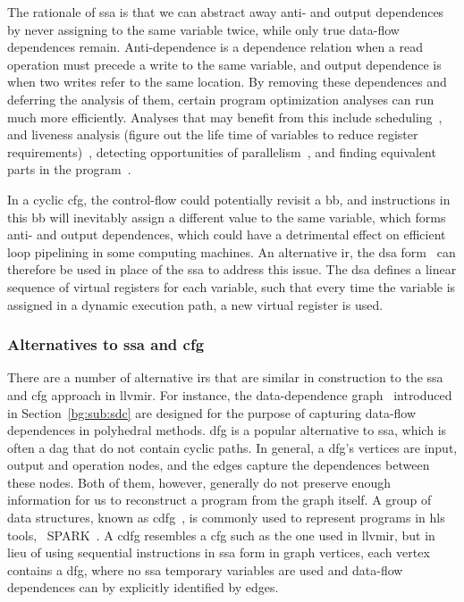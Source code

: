 The rationale of \gls{ssa} is that we can abstract away anti- and output
dependences by never assigning to the same variable twice, while only true
data-flow dependences remain.  Anti-dependence is a dependence relation when a
read operation must precede a write to the same variable, and output dependence
is when two writes refer to the same location.  By removing these dependences
and deferring the analysis of them, certain program optimization analyses
can run much more efficiently.  Analyses that may benefit from this include
scheduling~\cite{rau94}, and liveness analysis (figure out the life time
of variables to reduce register requirements)~\cite{cytron91}, detecting
opportunities of parallelism~\cite{cytron87}, and finding equivalent parts in
the program~\cite{alpern88}.

In a cyclic \gls{cfg}, the control-flow could potentially revisit a \gls{bb},
and instructions in this \gls{bb} will inevitably assign a different value to
the same variable, which forms anti- and output dependences, which could have
a detrimental effect on efficient loop pipelining in some computing machines.
An alternative \gls{ir}, the \gls{dsa} form~\cite{rau92} can therefore be used
in place of the \gls{ssa} to address this issue.  The \gls{dsa} defines a
linear sequence of virtual registers for each variable, such that every time
the variable is assigned in a dynamic execution path, a new virtual register is
used.

\subsubsection{Alternatives to \gls{ssa} and \gls{cfg}}

There are a number of alternative \glspl{ir} that are similar in construction
to the \gls{ssa} and \gls{cfg} approach in \gls{llvmir}\@.  For instance, the
data-dependence graph~\cite{rau94} introduced in Section~\ref{bg:sub:sdc} are
designed for the purpose of capturing data-flow dependences in polyhedral
methods. \gls{dfg} is a popular alternative to \gls{ssa}, which is often a
\gls{dag} that do not contain cyclic paths.  In general, a \gls{dfg}'s vertices
are input, output and operation nodes, and the edges capture the dependences
between these nodes.  Both of them, however, generally do not preserve enough
information for us to reconstruct a program from the graph itself.  A group of
data structures, known as \gls{cdfg}~\cite{orailoglu86}, is commonly used to
represent programs in \gls{hls} tools, \eg~SPARK~\cite{gupta04}.  A \gls{cdfg}
resembles a \gls{cfg} such as the one used in \gls{llvmir}, but in lieu of
using sequential instructions in \gls{ssa} form in graph vertices, each vertex
contains a \gls{dfg}, where no \gls{ssa} temporary variables are used and
data-flow dependences can by explicitly identified by edges.



